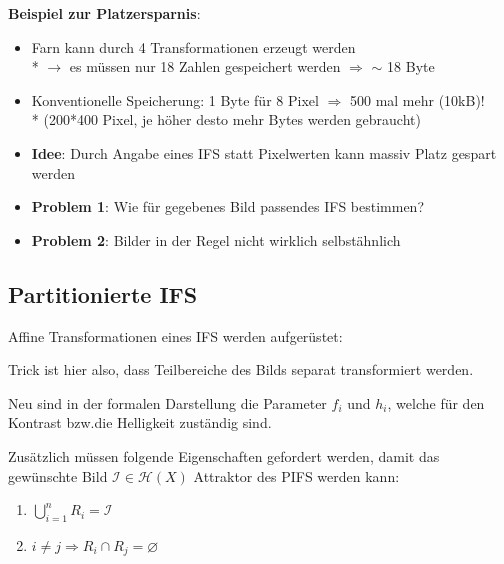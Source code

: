 \documentclass[afourpaper]{latex-classes/handout}
\newcommand{\marginrule}{\makebox[\linewidth]{\rule{\linewidth}{0.4pt}}}
\renewcommand{\emph}[1]{\textcolor{kitGreen}{#1}}
\begin{document}
\begin{marginfigure}[10em]
  \textbf{Beispiel zur Platzersparnis}: \\
  \begin{itemize}
    \item Farn kann durch 4 Transformationen erzeugt werden \\*
      \( \to \) es müssen nur 18 Zahlen gespeichert werden \( \Rightarrow \) \emph{\( \sim \) 18 Byte}
    \item Konventionelle Speicherung: 1 Byte für 8 Pixel \( \Rightarrow \) \emph{500 mal mehr} (10kB)! \\*
    (200*400 Pixel, je höher desto mehr Bytes werden gebraucht)
  \end{itemize}
  \marginrule{}
\end{marginfigure}

\begin{itemize}
  \item \textbf{Idee}: Durch Angabe eines IFS statt Pixelwerten kann massiv Platz gespart werden
  \item \textbf{Problem 1}: Wie für gegebenes Bild passendes IFS bestimmen?
  \item \textbf{Problem 2}: Bilder in der Regel nicht wirklich selbstähnlich
\end{itemize}

\subsection{Partitionierte IFS}

Affine Transformationen eines IFS werden aufgerüstet:

\begin{marginfigure}
  Trick ist hier also, dass Teilbereiche des Bilds separat transformiert werden.

  Neu sind in der formalen Darstellung die Parameter \( f_i \) und \( h_i \), welche für den Kontrast bzw.\@ die Helligkeit zuständig sind.

  Zusätzlich müssen folgende Eigenschaften gefordert werden, damit das gewünschte Bild \( \mathcal{I} \in \mathcal{H}(X) \) Attraktor des PIFS werden kann:
  \begin{enumerate}
    \item \( \bigcup_{i=1}^n R_i = \mathcal{I} \)
    \item \( i \neq j \Rightarrow R_i \cap R_j = \varnothing \)
  \end{enumerate}
\end{marginfigure}
\end{document}
